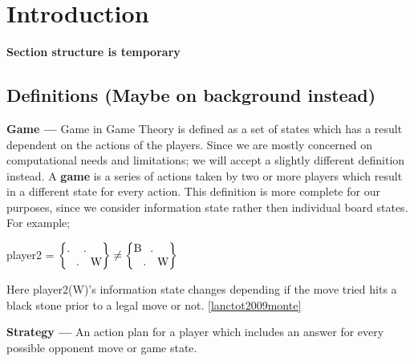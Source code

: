 \section{Introduction}

\textbf{Section structure is temporary}

\subsection{Definitions (Maybe on background instead)}

\textbf{Game ---} Game in Game Theory is defined as a set of states which has a result dependent on the actions of the players. Since we are mostly concerned on computational needs and limitations; we will accept a slightly different definition instead. A \textbf{game} is a series of actions taken by two or more players which result in a different state for every action. This definition is more complete for our purposes, since we consider information state rather then individual board states. For example;

\vspace{12px}
\centerline{player2 =
$\left\{
\begin{tabular}{@{}l@{}}
    . \hspace{3px} .\\
    \hspace{5px} . \hspace{1px} W
\end{tabular}
\right\}\neq
\left\{
\begin{tabular}{@{}l@{}}
    B \hspace{1px} .\\
    \hspace{5px} . \hspace{1px} W
\end{tabular}
\right\}$}



\vspace{12px}
Here player2(W)'s information state changes depending if the move tried hits a black stone prior to a legal move or not. \ref{lanctot2009monte}

\vspace{14px}
\textbf{Strategy ---} An action plan for a player which includes an answer for every possible opponent move or game state.